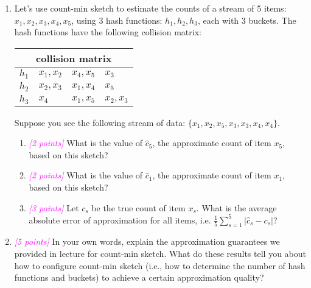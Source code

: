 \documentclass{exam}
\newcommand{\grade}[1]{\small\textcolor{magenta}{\emph{[#1 points]}} \normalsize}
\begin{document}
\begin{enumerate}[label=(\alph*)]

\item Let's use count-min sketch to estimate the counts of a stream of 5 items: $x_1, x_2, x_3, x_4, x_5$, using 3 hash functions: $h_1, h_2, h_3$, each with 3 buckets. The hash functions have the following collision matrix: 

\begin{center}
\begin{tabular}{ |p{3cm}||p{3cm}|p{3cm}|p{3cm}|  }
 \hline
 \multicolumn{4}{|c|}{collision matrix} \\
 \hline
 $h_1$   & $x_1, x_2$    &$x_4, x_5$ &   $x_3$ \\
 \hline
 $h_2$&   $x_2, x_3$  & $x_1, x_4$   & $x_5$ \\
 \hline
$h_3$ & $x_4$ & $x_1, x_5$ &  $x_2, x_3$ \\
 \hline
\end{tabular}
\end{center} \hspace{0pt}

Suppose you see the following stream of data: $\{x_1, x_2, x_5, x_3, x_3, x_4, x_4\}$.

\begin{enumerate}[label=\roman*.]
    \item \grade{2} What is the value of $\hat{c}_5$, the approximate count of item $x_5$, based on this sketch? 
    
    \vspace{2em} 
    \item \grade{2} What is the value of $\hat{c}_1$, the approximate count of item $x_1$, based on this sketch?
    
    \vspace{2em} 
    \item \grade{3} Let $c_s$ be the true count of item $x_s$. What is the average absolute error of approximation for all items, i.e. $\frac{1}{5}\sum_{s=1}^5|\hat{c}_s-c_s|$?
    
    \vspace{3em}
    
\end{enumerate}


\item \grade{5} In your own words, explain the approximation guarantees we provided in lecture for count-min sketch. What do these results tell you about how to configure count-min sketch (i.e., how to determine the number of hash functions and buckets) to achieve a certain approximation quality?

\end{enumerate}
\end{document}
